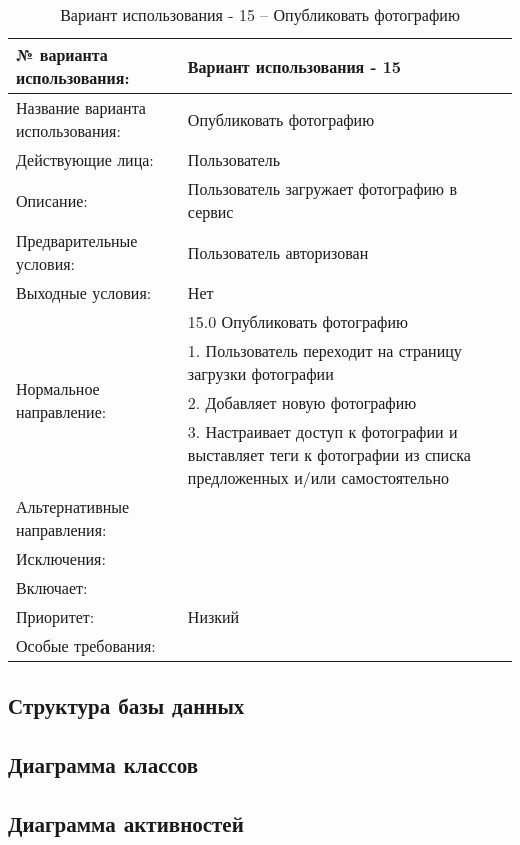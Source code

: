 \begin{table}[H]
  \caption{Вариант использования - 15 – Опубликовать фотографию}\label{use-case-15-table}
  \begin{tabular}{|p{6cm}|p{10cm}|}
  \hline № варианта использования: & Вариант использования - 15 \\
  \hline Название варианта использования: & Опубликовать фотографию \\
  \hline Действующие лица: & Пользователь \\
  \hline Описание: & Пользователь загружает фотографию в сервис \\
  \hline Предварительные условия: & Пользователь авторизован \\
  \hline Выходные условия: & Нет \\
  \hline \multirow{4}{*}{Нормальное направление:} & 15.0 Опубликовать фотографию \\
  \cline{2-2} & 1. Пользователь переходит на страницу загрузки фотографии \\
  \cline{2-2} & 2. Добавляет новую фотографию \\
  \cline{2-2} & 3. Настраивает доступ к фотографии и выставляет теги к фотографии из списка предложенных и/или самостоятельно \\
  \hline Альтернативные направления: &  \\
  \hline Исключения: &  \\
  \hline Включает: &  \\
  \hline Приоритет: & Низкий \\
  \hline Особые требования: & \\
  \hline
  \end{tabular}
\end{table}


\subsection{Структура базы данных}

\subsection{Диаграмма классов}

\subsection{Диаграмма активностей}

\clearpage
